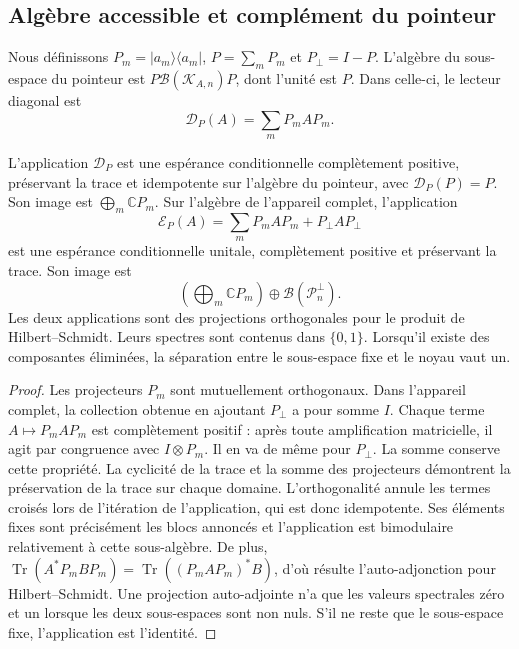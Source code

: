 \subsection{Algèbre accessible et complément du pointeur}
\label{vii:sec:observador-expectativa}

Nous définissons \(P_m=|a_m\rangle\langle a_m|\), \(P=\sum_mP_m\) et \(P_\perp=I-P\). L'algèbre du sous-espace du pointeur est \(P\mathcal B(\mathcal K_{A,n})P\), dont l'unité est \(P\). Dans celle-ci, le lecteur diagonal est
\[
 \mathcal D_P(A)=\sum_mP_mAP_m.
\]

\begin{proposition}
\label{vii:prop:observador-pinzamiento}
L'application \(\mathcal D_P\) est une espérance conditionnelle complètement positive, préservant la trace et idempotente sur l'algèbre du pointeur, avec \(\mathcal D_P(P)=P\). Son image est \(\bigoplus_m\mathbb CP_m\). Sur l'algèbre de l'appareil complet, l'application
\begin{equation}
 \mathcal E_P(A)=\sum_mP_mAP_m+P_\perp AP_\perp
 \label{vii:eq:observador-complemento}
\end{equation}
est une espérance conditionnelle unitale, complètement positive et
préservant la trace. Son image est
\[
 \left(\bigoplus_m\mathbb CP_m\right)
 \oplus\mathcal B(\mathcal P_n^\perp).
\]
Les deux applications sont des projections orthogonales pour le produit de
Hilbert--Schmidt. Leurs spectres sont contenus dans \(\{0,1\}\).
Lorsqu'il existe des composantes éliminées, la séparation entre le
sous-espace fixe et le noyau vaut un.
\end{proposition}

\begin{proof}
Les projecteurs \(P_m\) sont mutuellement orthogonaux. Dans l'appareil complet, la collection obtenue en ajoutant \(P_\perp\) a pour somme \(I\). Chaque terme \(A\mapsto P_mAP_m\) est complètement positif : après toute amplification matricielle, il agit par congruence avec \(I\otimes P_m\). Il en va de même pour \(P_\perp\). La somme conserve cette propriété. La cyclicité de la trace et la somme des projecteurs démontrent la préservation de la trace sur chaque domaine. L'orthogonalité annule les termes croisés lors de l'itération de l'application, qui est donc idempotente. Ses éléments fixes sont précisément les blocs annoncés et l'application est bimodulaire relativement à cette sous-algèbre. De plus, \(\operatorname{Tr}(A^*P_mBP_m)
 =\operatorname{Tr}((P_mAP_m)^*B)\), d'où résulte l'auto-adjonction pour Hilbert--Schmidt. Une projection auto-adjointe n'a que les valeurs spectrales zéro et un lorsque les deux sous-espaces sont non nuls. S'il ne reste que le sous-espace fixe, l'application est l'identité.
\end{proof}

